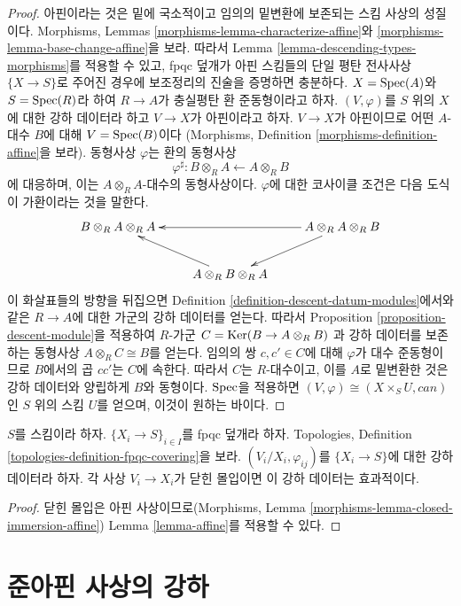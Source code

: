 \begin{proof}
아핀이라는 것은 밑에 국소적이고 임의의 밑변환에 보존되는 스킴 사상의
성질이다. Morphisms, Lemmas \ref{morphisms-lemma-characterize-affine}와
\ref{morphisms-lemma-base-change-affine}을 보라. 따라서 Lemma
\ref{lemma-descending-types-morphisms}를 적용할 수 있고, fpqc 덮개가
아핀 스킴들의 단일 평탄 전사사상 $\{X \to S\}$로 주어진 경우에
보조정리의 진술을 증명하면 충분하다. $X = \mathop{\mathrm{Spec}}(A)$와 $S = \mathop{\mathrm{Spec}}(R)$라
하여 $R \to A$가 충실평탄 환 준동형이라고 하자. $(V, \varphi)$를
$S$ 위의 $X$에 대한 강하 데이터라 하고 $V \to X$가 아핀이라고 하자.
$V \to X$가 아핀이므로 어떤 $A$-대수 $B$에 대해 $V = \mathop{\mathrm{Spec}}(B)$이다
(Morphisms, Definition \ref{morphisms-definition-affine}을 보라).
동형사상 $\varphi$는 환의 동형사상
$$
\varphi^\sharp :
B \otimes_R A \longleftarrow A \otimes_R B
$$
에 대응하며, 이는 $A \otimes_R A$-대수의 동형사상이다. $\varphi$에
대한 코사이클 조건은 다음 도식이 가환이라는 것을 말한다.
$$
\xymatrix{
B \otimes_R A \otimes_R A & &
A \otimes_R A \otimes_R B \ar[ll] \ar[ld]\\
& A \otimes_R B \otimes_R A \ar[lu] &
}
$$
이 화살표들의 방향을 뒤집으면 Definition
\ref{definition-descent-datum-modules}에서와 같은 $R \to A$에 대한
가군의 강하 데이터를 얻는다. 따라서 Proposition
\ref{proposition-descent-module}을 적용하여 $R$-가군
$C = \mathop{\mathrm{Ker}}(B \to A \otimes_R B)$
과 강하 데이터를 보존하는 동형사상 $A \otimes_R C \cong B$를 얻는다.
임의의 쌍 $c, c' \in C$에 대해 $\varphi$가 대수 준동형이므로 $B$에서의
곱 $cc'$는 $C$에 속한다. 따라서 $C$는 $R$-대수이고, 이를 $A$로
밑변환한 것은 강하 데이터와 양립하게 $B$와 동형이다. $\mathop{\mathrm{Spec}}$을
적용하면 $(V, \varphi) \cong (X \times_S U, can)$인 $S$ 위의 스킴
$U$를 얻으며, 이것이 원하는 바이다.
\end{proof}

\begin{lemma}
\label{lemma-closed-immersion}
$S$를 스킴이라 하자. $\{X_i \to S\}_{i\in I}$를 fpqc 덮개라 하자.
Topologies, Definition \ref{topologies-definition-fpqc-covering}을 보라.
$(V_i/X_i, \varphi_{ij})$를 $\{X_i \to S\}$에 대한 강하 데이터라 하자.
각 사상 $V_i \to X_i$가 닫힌 몰입이면 이 강하 데이터는 효과적이다.
\end{lemma}

\begin{proof}
닫힌 몰입은 아핀 사상이므로(Morphisms, Lemma
\ref{morphisms-lemma-closed-immersion-affine}) Lemma
\ref{lemma-affine}를 적용할 수 있다.
\end{proof}


\section{준아핀 사상의 강하}
\label{section-quasi-affine}

